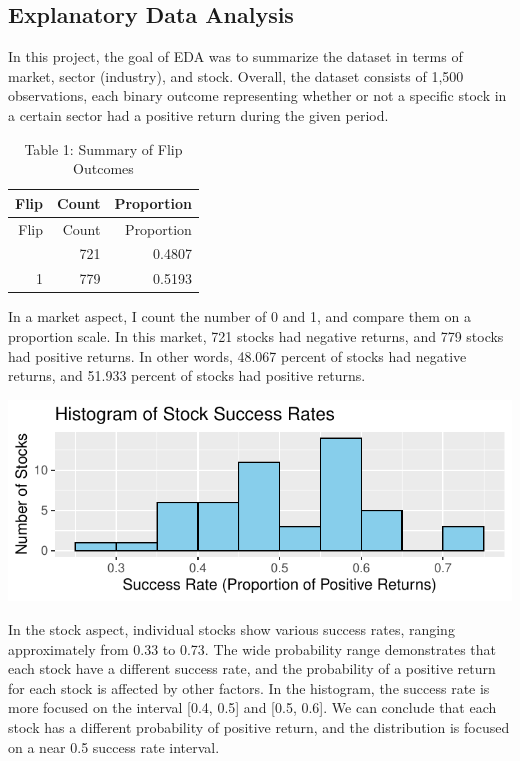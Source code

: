\documentclass[
  11pt,
]{article}
\begin{document}
\subsection{Explanatory Data Analysis}\label{explanatory-data-analysis}

In this project, the goal of EDA was to summarize the dataset in terms
of market, sector (industry), and stock. Overall, the dataset consists
of 1,500 observations, each binary outcome representing whether or not a
specific stock in a certain sector had a positive return during the
given period.

\begin{longtable}[]{@{}rrr@{}}
\caption{Table 1: Summary of Flip Outcomes}\tabularnewline
\toprule\noalign{}
Flip & Count & Proportion \\
\midrule\noalign{}
\endfirsthead
\toprule\noalign{}
Flip & Count & Proportion \\
\midrule\noalign{}
\endhead
\bottomrule\noalign{}
\endlastfoot
0 & 721 & 0.4807 \\
1 & 779 & 0.5193 \\
\end{longtable}

In a market aspect, I count the number of 0 and 1, and compare them on a
proportion scale. In this market, 721 stocks had negative returns, and
779 stocks had positive returns. In other words, 48.067 percent of
stocks had negative returns, and 51.933 percent of stocks had positive
returns.

\includegraphics{Final-Project_files/figure-latex/unnamed-chunk-2-1.pdf}

In the stock aspect, individual stocks show various success rates,
ranging approximately from 0.33 to 0.73. The wide probability range
demonstrates that each stock have a different success rate, and the
probability of a positive return for each stock is affected by other
factors. In the histogram, the success rate is more focused on the
interval {[}0.4, 0.5{]} and {[}0.5, 0.6{]}. We can conclude that each
stock has a different probability of positive return, and the
distribution is focused on a near 0.5 success rate interval.
\end{document}
